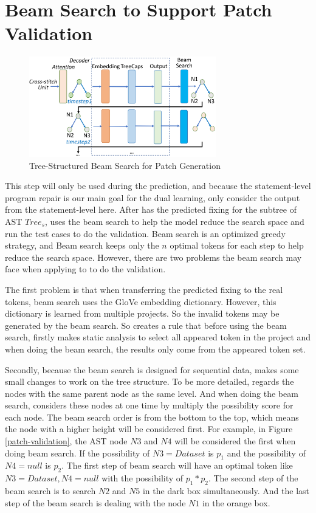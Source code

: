 \section{Beam Search to Support Patch Validation}

\begin{figure}[t]
	\centering
	\includegraphics[width=3.2in]{graphs/beam-search.png}
	\caption{Tree-Structured Beam Search for Patch Generation}
	\label{beam}
\end{figure}

%

This step will only be used during the prediction, and because the statement-level program repair is our main goal for the dual learning, \tool only consider the output from the statement-level here. After \tool has the predicted fixing for the subtree of AST $Tree_s$, \tool uses the beam search to help the model reduce the search space and run the test cases to do the validation. Beam search is an optimized greedy strategy, and Beam search keeps only the $n$ optimal tokens for each step to help reduce the search space. However, there are two problems the beam search may face when applying to \tool to do the validation.

The first problem is that when transferring the predicted fixing to the real tokens, beam search uses the GloVe embedding dictionary. However, this dictionary is learned from multiple projects. So the invalid tokens may be generated by the beam search. So \tool creates a rule that before using the beam search, \tool firstly makes static analysis to select all appeared token in the project and when doing the beam search, the results only come from the appeared token set.

Secondly, because the beam search is designed for sequential data, \tool makes some small changes to work on the tree structure. To be more detailed, \tool regards the nodes with the same parent node as the same level. And when doing the beam search, \tool considers these nodes at one time by multiply the possibility score for each node. The beam search order is from the bottom to the top, which means the node with a higher height will be considered first. For example, in Figure \ref{patch-validation}, the AST node $N3$ and $N4$ will be considered the first when doing beam search. If the possibility of $N3=Dataset$ is $p_1$ and the possibility of $N4=null$ is $p_2$. The first step of beam search will have an optimal token like $N3=Dataset, N4=null$ with the possibility of $p_1*p_2$. The second step of the beam search is to search $N2$ and $N5$ in the dark box simultaneously. And the last step of the beam search is dealing with the node $N1$ in the orange box. 

